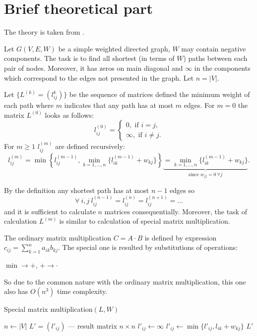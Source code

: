 \documentclass[12pt, bachelor, substylefile = algo_title.rtx]{disser}
\theoremstyle{definition}
\begin{document}
\section{Brief theoretical part}
The theory is taken from \cite{Cormen09}.

Let $G(V, E, W)$ be a simple weighted directed graph, $W$ may contain negative components. The task is to find all shortest (in terms of $W$) paths between each pair of nodes. Moreover, it has zeros on main diagonal and $\infty$ in the components which correspond to the edges not presented in the graph. Let $n = |V|$.

Let $\{L^{(k)} = (l^{k}_{ij})\}$ be the sequence of matrices defined the minimum weight of each path where $m$ indicates that any path has at most $m$ edges. For $m = 0$ the matrix $L^{(0)}$ looks as follows:
\begin{equation*}
l^{(0)}_{ij} = 
\begin{cases}
0, \text{ if }i = j,\\
\infty, \text{ if } i \ne j.
\end{cases}
\end{equation*}
For $m \ge 1$ $l^{(m)}_{ij}$ are defined recursively:
\[ l^{(m)}_{ij} = \min \left \{ l^{(m-1)}_{ij}, \min_{k=1,\dots,n}\{l^{(m-1)}_{ik} + w_{kj}\} \right \} \underbrace{= \min_{k=1,\dots,n}\{l^{(m-1)}_{ik} + w_{kj}\}}_{\text{since } w_{jj} = 0\ \forall j}. \]

By the definition any shortest path has at most $n-1$ edges so
\[ \forall \ i, j\ l^{(n-1)}_{ij} = l^{(n)}_{ij} = l^{(n+1)}_{ij} = \dots  \]
and it is sufficient to calculate $n$ matrices consequentially. Moreover, the task of calculation $L^(m)$ is similar to calculation of special matrix multiplication.

The ordinary matrix multiplication $C = A \cdot B$ is defined by expression $c_{ij} = \sum_{k=1}^n a_{ik}b_{kj}$. The special one is resulted by substitutions of operations:
\begin{outline}
\1 $\min \to +$,
\1 $+ \to \cdot$
\end{outline}

So due to the common nature with the ordinary matrix multiplication, this one also has $O(n^3)$ time complexity.
\begin{algorithm}[!h]
\caption{Special matrix multiplication$(L, W)$}
\label{alg: specmul}
\begin{algorithmic}
\State $n \gets |V|$
\State $L' = (l'_{ij})$ --- result matrix $n \times n$
		\State $l'_{ij} \gets \infty$
			\State	$l'_{ij} \gets \min \{ l'_{ij}, l_{ik} + w_{kj} \}$
		\EndFor
	\EndFor
\EndFor
\Ensure $L'$
\end{algorithmic}
\end{algorithm}
\end{document}
